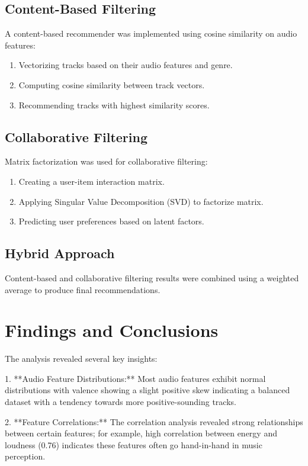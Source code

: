 \documentclass[runningheads]{llncs}
\begin{document}
\subsection{Content-Based Filtering}
A content-based recommender was implemented using cosine similarity on audio features:
\begin{enumerate}
    \item Vectorizing tracks based on their audio features and genre.
    \item Computing cosine similarity between track vectors.
    \item Recommending tracks with highest similarity scores.
\end{enumerate}

\subsection{Collaborative Filtering}
Matrix factorization was used for collaborative filtering:
\begin{enumerate}
    \item Creating a user-item interaction matrix.
    \item Applying Singular Value Decomposition (SVD) to factorize matrix.
    \item Predicting user preferences based on latent factors.
\end{enumerate}

\subsection{Hybrid Approach}
Content-based and collaborative filtering results were combined using a weighted average to produce final recommendations.

\section{Findings and Conclusions}

The analysis revealed several key insights:

1. **Audio Feature Distributions:** Most audio features exhibit normal distributions with valence showing a slight positive skew indicating a balanced dataset with a tendency towards more positive-sounding tracks.
  
2. **Feature Correlations:** The correlation analysis revealed strong relationships between certain features; for example, high correlation between energy and loudness (0.76) indicates these features often go hand-in-hand in music perception.
  
\end{document}
